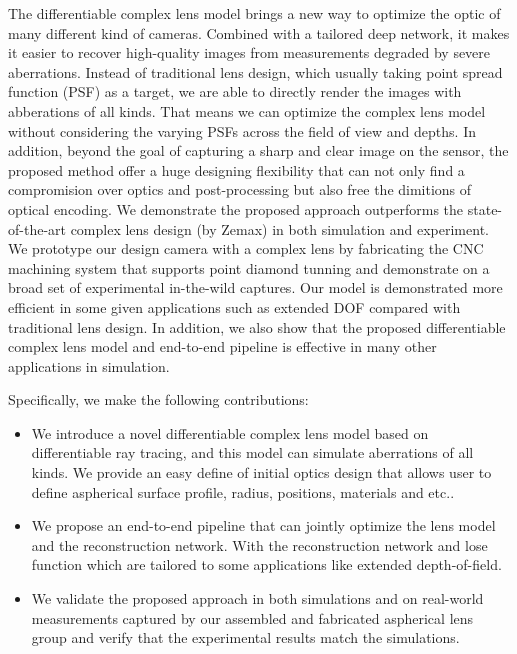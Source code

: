  The differentiable complex lens model brings a new way to optimize the optic of many different kind
 of cameras. Combined with a tailored deep network, it makes it easier to recover high-quality images
 from measurements degraded by severe aberrations. Instead of traditional lens design, which usually
 taking point spread function (PSF) as a target, we are able to directly render the images with 
 abberations of all kinds. That means we can optimize the complex lens model without considering the 
 varying PSFs across the field of view and depths. In addition, beyond the goal of capturing a sharp
 and clear image on the sensor, the proposed method offer a huge designing flexibility that can not only
 find a compromision over optics and post-processing but also free the dimitions of optical encoding.
 We demonstrate the proposed approach outperforms the state-of-the-art complex lens design (by Zemax)
 in both simulation and experiment. We prototype our design camera with a complex lens by fabricating the
 CNC machining system that supports point diamond tunning and demonstrate on a broad set of experimental 
 in-the-wild captures. Our model is demonstrated more efficient in some given applications such as
 extended DOF compared with traditional lens design. In addition, we also show that the proposed
 differentiable complex lens model and end-to-end pipeline is effective in many other applications in
 simulation.
 
 Specifically, we make the following contributions:

\vspace{-3pt}
\begin{itemize}
\item We introduce a novel differentiable complex lens model based on differentiable ray tracing, and this model can simulate aberrations of all kinds. We provide an easy define of initial optics design that allows user to define aspherical surface profile, radius, positions, materials and etc..

\item We propose an end-to-end pipeline that can jointly optimize the lens model and the reconstruction network. With the reconstruction network and lose function which are tailored 
to some applications like extended depth-of-field. 

\item We validate the proposed approach in both simulations and on real-world measurements captured
by our assembled and fabricated aspherical lens group and verify that the experimental results match 
the simulations. 
\vspace{3pt}

\end{itemize}


